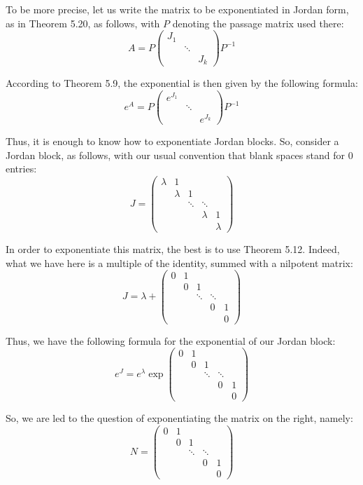 \documentclass[12pt]{amsbook}
\begin{document}
\bigskip

To be more precise, let us write the matrix to be exponentiated in Jordan form, as in Theorem 5.20, as follows, with $P$ denoting the passage matrix used there:
$$A=P\begin{pmatrix}
J_1\\
&\ddots\\
&&J_k
\end{pmatrix}P^{-1}$$

According to Theorem 5.9, the exponential is then given by the following formula:
$$e^A=P\begin{pmatrix}
e^{J_1}\\
&\ddots\\
&&e^{J_k}
\end{pmatrix}P^{-1}$$

Thus, it is enough to know how to exponentiate Jordan blocks. So, consider a Jordan block, as follows, with our usual convention that blank spaces stand for $0$ entries:
$$J=\begin{pmatrix}
\lambda&1\\
&\lambda&1\\
&&\ddots&\ddots\\
&&&\lambda&1\\
&&&&\lambda
\end{pmatrix}$$

In order to exponentiate this matrix, the best is to use Theorem 5.12. Indeed, what we have here is a multiple of the identity, summed with a nilpotent matrix:
$$J=\lambda+\begin{pmatrix}
0&1\\
&0&1\\
&&\ddots&\ddots\\
&&&0&1\\
&&&&0
\end{pmatrix}$$

Thus, we have the following formula for the exponential of our Jordan block:
$$e^J=e^{\lambda}\exp\begin{pmatrix}
0&1\\
&0&1\\
&&\ddots&\ddots\\
&&&0&1\\
&&&&0
\end{pmatrix}$$

So, we are led to the question of exponentiating the matrix on the right, namely:
$$N=\begin{pmatrix}
0&1\\
&0&1\\
&&\ddots&\ddots\\
&&&0&1\\
&&&&0
\end{pmatrix}$$
\end{document}
